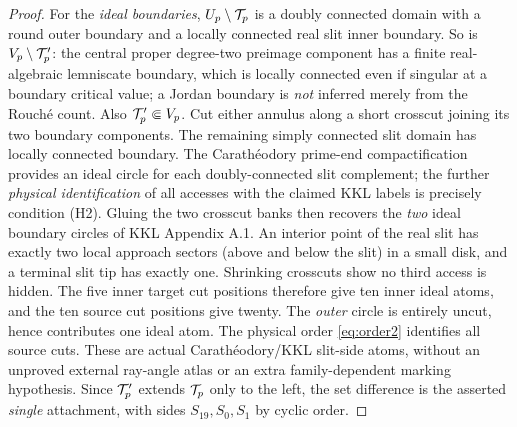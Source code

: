 \begin{proof}
For the \emph{ideal boundaries}, $U_p\setminus\mathcal T_p$
is a doubly connected domain with a round
outer boundary and a locally connected real
slit inner boundary.  So is
$V_p\setminus\mathcal T_p'$: the central proper degree-two preimage
component has a finite real-algebraic
lemniscate boundary, which is locally
connected even if singular at a
boundary critical value;
a Jordan boundary is \emph{not}
inferred merely from the Rouch\'e count.
Also $\mathcal T'_p\Subset V_p$.
Cut either annulus along a short crosscut
joining its two boundary components.
The remaining simply connected slit
domain has locally connected boundary.
The Carath\'eodory prime-end
compactification \cite{Caratheodory1913}
provides an ideal circle for each
doubly-connected slit complement;
the further \emph{physical identification}
of all accesses with the claimed KKL
labels is precisely condition (H2).
Gluing the two crosscut banks then recovers the \emph{two}
ideal boundary circles of KKL Appendix A.1.
An interior point of the real slit has
exactly two local approach sectors
(above and below the slit) in a small
disk, and a terminal slit tip has
exactly one.  Shrinking crosscuts
show no third access is hidden.
The five inner target cut positions
therefore give ten inner ideal atoms,
and the ten source cut positions give
twenty.  The \emph{outer} circle
is entirely uncut, hence contributes
one ideal atom.  The physical order
\eqref{eq:order2} identifies all source
cuts.  These are actual
Carath\'eodory/KKL slit-side atoms,
without an unproved external ray-angle
atlas or an extra family-dependent
marking hypothesis.  Since $\mathcal T'_p$
extends $\mathcal T_p$ only to the left,
the set difference is the asserted
\emph{single} attachment, with
sides $S_{19},S_0,S_1$ by cyclic order.
\end{proof}

